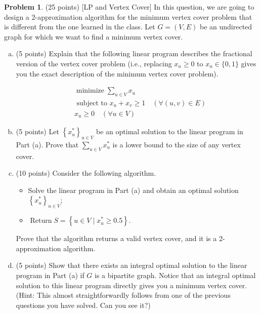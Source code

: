 \documentclass{article}
\theoremstyle{definition}
\newtheorem{prob}{Problem}
\begin{document}
	\begin{prob}
		(25 points) [LP and Vertex Cover] In this question, we are going to design a 2-approximation algorithm for the minimum vertex cover problem that is different from the one learned in the class. Let $G=(V, E)$ be an undirected graph for which we want to find a minimum vertex cover.
		
		\begin{enumerate}[(a)]
			\item (5 points) Explain that the following linear program describes the fractional version of the vertex cover problem (i.e., replacing $x_{u} \geq 0$ to $x_{u} \in\{0,1\}$ gives you the exact description of the minimum vertex cover problem).
			
			$$
			\begin{aligned}
				& \operatorname{minimize} \sum_{u \in V} x_{u} \\
				& \text { subject to } x_{u}+x_{v} \geq 1 \quad(\forall(u, v) \in E) \\
				& x_{u} \geq 0 \quad(\forall u \in V)
			\end{aligned}
			$$
			\item (5 points) Let $\left\{x_{u}^{*}\right\}_{u \in V}$ be an optimal solution to the linear program in Part (a). Prove that $\sum_{u \in V} x_{u}^{*}$ is a lower bound to the size of any vertex cover.
			\item (10 points) Consider the following algorithm.
			
			\begin{itemize}
				\item Solve the linear program in Part (a) and obtain an optimal solution $\left\{x_{u}^{*}\right\}_{u \in V}$;
				
				\item $\operatorname{Return} S=\left\{u \in V \mid x_{u}^{*} \geq 0.5\right\}$.
				
			\end{itemize}
			
			Prove that the algorithm returns a valid vertex cover, and it is a 2-approximation algorithm.
			
			\item (5 points) Show that there exists an integral optimal solution to the linear program in Part (a) if $G$ is a bipartite graph. Notice that an integral optimal solution to this linear program directly gives you a minimum vertex cover. (Hint: This almost straightforwardly follows from one of the previous questions you have solved. Can you see it?)
		\end{enumerate}
	\end{prob}
	
\end{document}
